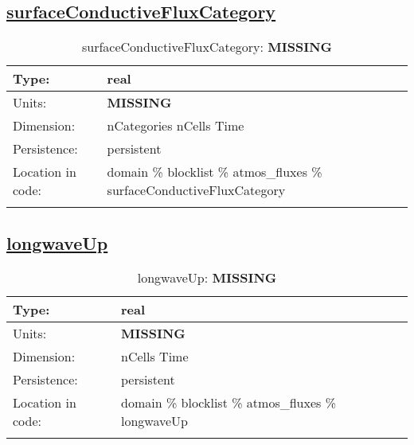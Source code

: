 \subsection[surfaceConductiveFluxCategory]{\hyperref[sec:var_tab_atmos_fluxes]{surfaceConductiveFluxCategory}}
\label{subsec:var_sec_atmos_fluxes_surfaceConductiveFluxCategory}
\begin{center}
\begin{longtable}{| p{2.0in} | p{4.0in} |}
        \hline 
        Type: & real \\
        \hline 
        Units: & {\bf \color{red} MISSING} \\
        \hline 
        Dimension: & nCategories nCells Time \\
        \hline 
        Persistence: & persistent \\
        \hline 
         Location in code: & domain \% blocklist \% atmos\_fluxes \% surfaceConductiveFluxCategory \\
         \hline 
    \caption{surfaceConductiveFluxCategory: {\bf \color{red} MISSING}}
\end{longtable}
\end{center}
\subsection[longwaveUp]{\hyperref[sec:var_tab_atmos_fluxes]{longwaveUp}}
\label{subsec:var_sec_atmos_fluxes_longwaveUp}
\begin{center}
\begin{longtable}{| p{2.0in} | p{4.0in} |}
        \hline 
        Type: & real \\
        \hline 
        Units: & {\bf \color{red} MISSING} \\
        \hline 
        Dimension: & nCells Time \\
        \hline 
        Persistence: & persistent \\
        \hline 
         Location in code: & domain \% blocklist \% atmos\_fluxes \% longwaveUp \\
         \hline 
    \caption{longwaveUp: {\bf \color{red} MISSING}}
\end{longtable}
\end{center}
